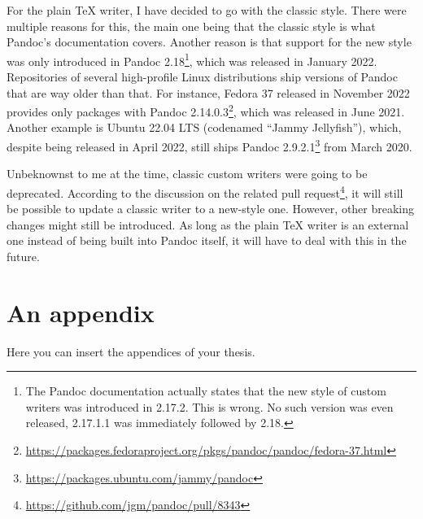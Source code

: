 \documentclass[
  digital,     %
  oneside,     %
  nosansbold,  %
  nocolorbold, %
  lof,         %
  lot,         %
]{fithesis4}
\begin{document}
For the plain \TeX{} writer, I have decided to go with the classic style. There were multiple reasons for this, the main one being that the classic style is what Pandoc's documentation covers. Another reason is that support for the new style was only introduced in Pandoc 2.18\footnote{The Pandoc documentation actually states that the new style of custom writers was introduced in 2.17.2. This is wrong. No such version was even released, 2.17.1.1 was immediately followed by 2.18.}, which was released in January 2022. Repositories of several high-profile Linux distributions ship versions of Pandoc that are way older than that. For instance, Fedora 37 released in November 2022 provides only packages with Pandoc 2.14.0.3\footnote{\url{https://packages.fedoraproject.org/pkgs/pandoc/pandoc/fedora-37.html}}, which was released in June 2021. Another example is Ubuntu 22.04 LTS (codenamed ``Jammy Jellyfish''), which, despite being released in April 2022, still ships Pandoc 2.9.2.1\footnote{\url{https://packages.ubuntu.com/jammy/pandoc}} from March 2020.

Unbeknownst to me at the time, classic custom writers were going to be deprecated. According to the discussion on the related pull request\footnote{\url{https://github.com/jgm/pandoc/pull/8343}}, it will still be possible to update a classic writer to a new-style one. However, other breaking changes might still be introduced. As long as the plain \TeX{} writer is an external one instead of being built into Pandoc itself, it will have to deal with this in the future.

\printbibliography[heading=bibintoc] %

\makeatletter\thesis@blocks@clear\makeatother
{} %
\printindex

\appendix %
\chapter{An appendix}
Here you can insert the appendices of your thesis.
\end{document}
